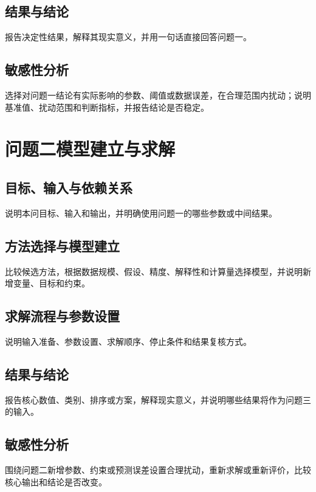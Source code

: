 \documentclass[UTF8,a4paper,12pt]{ctexart}
\newif\ifshowguide
\newcommand{\WriteGuide}[3]{%
  \ifshowguide
  \begin{quote}
    \small
    \textbf{写什么：}#1\par
    \textbf{怎么写：}#2\par
    \textbf{避免：}#3
  \end{quote}
  \fi
}
\begin{document}
\subsection{结果与结论}
报告决定性结果，解释其现实意义，并用一句话直接回答问题一。

\subsection{敏感性分析}
选择对问题一结论有实际影响的参数、阈值或数据误差，在合理范围内扰动；说明基准值、扰动范围和判断指标，并报告结论是否稳定。

\section{问题二模型建立与求解}

\WriteGuide
  {说明问题二如何承接问题一，并突出新增目标、变量、约束或评价准则。}
  {按照“目标与依赖—方法选择—模型建立—求解—结果—结论”展开。}
  {重复抄写问题一；没有说明输入来源；只报告结果而不检查误差或约束。}

\subsection{目标、输入与依赖关系}
说明本问目标、输入和输出，并明确使用问题一的哪些参数或中间结果。

\subsection{方法选择与模型建立}
比较候选方法，根据数据规模、假设、精度、解释性和计算量选择模型，并说明新增变量、目标和约束。

\subsection{求解流程与参数设置}
说明输入准备、参数设置、求解顺序、停止条件和结果复核方式。

\subsection{结果与结论}
报告核心数值、类别、排序或方案，解释现实意义，并说明哪些结果将作为问题三的输入。

\subsection{敏感性分析}
围绕问题二新增参数、约束或预测误差设置合理扰动，重新求解或重新评价，比较核心输出和结论是否改变。
\end{document}
